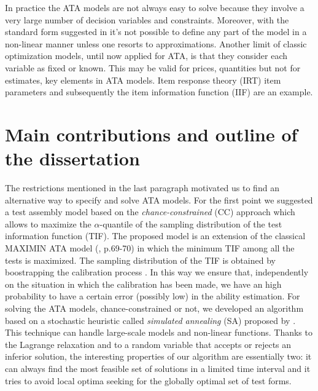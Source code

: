 In practice the ATA models are not always easy to solve because they involve a very large number of decision variables and constraints. Moreover, with the standard form suggested in \textcite{VanDerLinden2005} it's not possible to define any part of the model in a non-linear manner unless one resorts to approximations. Another limit of classic optimization models, until now applied for ATA, is that they consider each variable as fixed or known. This may be valid for prices, quantities but not for estimates, key elements in ATA models. Item response theory (IRT) item parameters and subsequently the item information function (IIF) are an example.

\section{Main contributions and outline of the dissertation}

The restrictions mentioned in the last paragraph motivated us to find an alternative way to specify and solve ATA models.
For the first point we suggested a test assembly model based on the \emph{chance-constrained} (CC) approach \parencite[see][]{charnes1958cost} which allows to maximize the $\alpha$-quantile of the sampling distribution of the test information function (TIF).
The proposed model is an extension of the classical MAXIMIN ATA model (\textcite{VanDerLinden2005}, p.69-70) in which the minimum TIF among all the tests is maximized.
The sampling distribution of the TIF is obtained by boostrapping the calibration process \parencite{efron1993, shao2012}. In this way we ensure that, independently on the situation in which the calibration has been made, we have an high probability to have a certain error (possibly low) in the ability estimation.
For solving the ATA models, chance-constrained or not, we developed an algorithm based on a stochastic heuristic called \emph{simulated annealing} (SA) proposed by \textcite{goffe1996simann}.
This technique can handle large-scale models and non-linear functions.
Thanks to the Lagrange relaxation and to a random variable that accepts or rejects an inferior solution, the interesting properties of our algorithm are essentially two: it can always find the most feasible set of solutions in a limited time interval and it tries to avoid local optima seeking for the globally optimal set of test forms.

